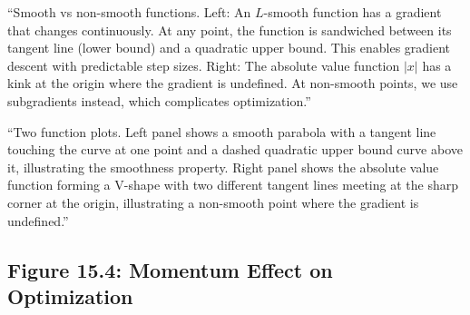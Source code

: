 \documentclass[12pt]{article}
\begin{document}
\begin{description}[style=nextline, leftmargin=0pt]
    \item[Caption Text]
    ``Smooth vs non-smooth functions. Left: An $L$-smooth function has a gradient that changes continuously. At any point, the function is sandwiched between its tangent line (lower bound) and a quadratic upper bound. This enables gradient descent with predictable step sizes. Right: The absolute value function $|x|$ has a kink at the origin where the gradient is undefined. At non-smooth points, we use subgradients instead, which complicates optimization.''

    \item[Alt-Text for Accessibility]
    ``Two function plots. Left panel shows a smooth parabola with a tangent line touching the curve at one point and a dashed quadratic upper bound curve above it, illustrating the smoothness property. Right panel shows the absolute value function forming a V-shape with two different tangent lines meeting at the sharp corner at the origin, illustrating a non-smooth point where the gradient is undefined.''
\end{description}

\newpage

\subsection{Figure 15.4: Momentum Effect on Optimization}
\end{document}
